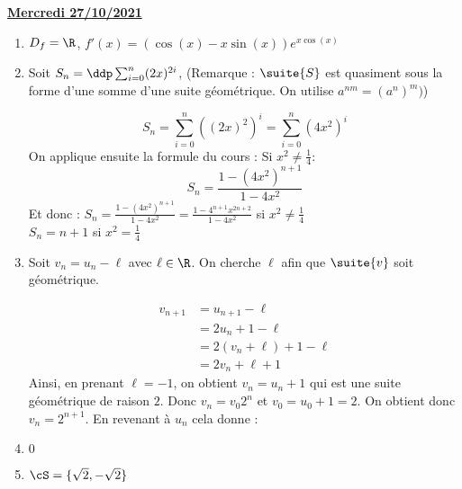 \documentclass[a4paper, 11pt,reqno]{article}
\newcommand{\jour}[1]{
\begin{center}
\underline{\textbf{#1}}
\end{center}

 }
\begin{document}
\jour{Mercredi 27/10/2021}
\begin{correction}
\begin{enumerate}
\item $D_f= \R$, $f'(x) =(\cos(x) -x\sin(x) ) e^{x\cos(x)}$
\item 
Soit $S_n=\ddp \sum_{i=0}^n (2x)^{2i}$, (Remarque : $\suite{S}$ est quasiment sous la forme d'une somme d'une suite géométrique. On utilise $a^{nm} = (a^{n})^m)$) 

$$S_n = \sum_{i=0}^n ((2x)^2)^i= \sum_{i=0}^n (4x^2)^i$$
On applique ensuite la formule du cours : 
Si $x^2\neq \frac{1}{4}$:
$$S_n =\frac{1-(4x^2)^{n+1}}{1-4x^2}$$
Et donc :
$S_n= \frac{1-(4x^2)^{n+1}}{1-4x^2} = \frac{1-4^{n+1}x^{2n+2}}{1-4x^2}$ si $x^2\neq \frac{1}{4}$\\
$S_n=n+1$ si $x^2=\frac{1}{4}$

\item 
Soit $v_n =u_n-\ell$ avec $\ell \in \R$. On cherche $\ell$ afin que $\suite{v}$ soit géométrique. 

\begin{align*}
v_{n+1}&=u_{n+1}-\ell\\
			&= 2u_n+1-\ell\\
			&=2(v_n+\ell) +1-\ell\\
			&=2v_n+ \ell +1
\end{align*}
Ainsi, en prenant $\ell =-1$, on obtient $v_n = u_n+1$ qui est une suite géométrique de raison $2$. 
Donc $v_n =v_0 2^n $ et $v_0 = u_0+1=2$. On obtient donc $v_n =2^{n+1}$. En revenant à $u_n$ cela donne  : 



\item $0$
\item $\cS=\{ \sqrt{2}, -\sqrt{2}\}$
\end{enumerate}
\end{correction} 
\end{document}
